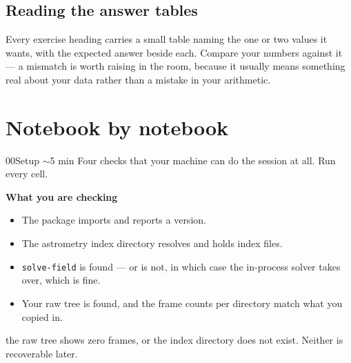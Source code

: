\documentclass[11pt,a4paper]{article}
\newcommand{\cm}[1]{\texttt{\small #1}}
\newcommand{\recordline}[2]{%
  \vspace{6pt}{\color{rule}\hrule}\vspace{6pt}%
  \noindent{\sffamily\bfseries\scriptsize\color{accent}\MakeUppercase{#1}}\hspace{6pt}%
  \begin{minipage}[t]{0.78\textwidth}\small #2\end{minipage}}
\begin{document}
\subsection{Reading the answer tables}
Every exercise heading carries a small table naming the one or two values it wants, with the
expected answer beside each. Compare your numbers against it --- a mismatch is worth raising in
the room, because it usually means something real about your data rather than a mistake in your
arithmetic.

\section{Notebook by notebook}

\begin{nbbox}{00}{Setup \quad\textnormal{\sffamily\scriptsize\color{inkfaint}$\sim$5 min}}
\small\color{inksoft} Four checks that your machine can do the session at all. Run every cell.
\par\vspace{6pt}\color{ink}
{\sffamily\bfseries\small What you are checking}
\begin{itemize}
\item The package imports and reports a version.
\item The astrometry index directory resolves and holds index files.
\item \cm{solve-field} is found --- or is not, in which case the in-process solver takes over,
which is fine.
\item Your raw tree is found, and the frame counts per directory match what you copied in.
\end{itemize}
\recordline{Stop if}{the raw tree shows zero frames, or the index directory does not exist.
Neither is recoverable later.}
\end{nbbox}
\end{document}
